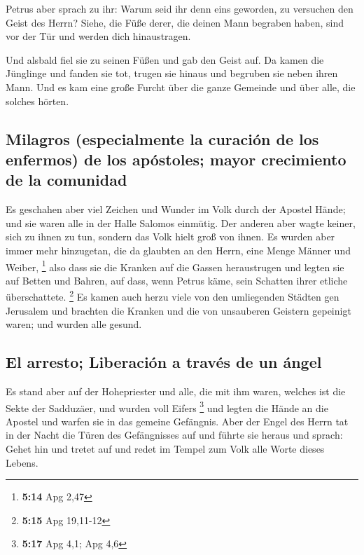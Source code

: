  Petrus aber sprach zu ihr: Warum seid ihr denn eins
geworden, zu versuchen den Geist des Herrn? Siehe, die Füße derer, die
deinen Mann begraben haben, sind vor der Tür und werden dich
hinaustragen.

 Und alsbald fiel sie zu seinen Füßen und gab den Geist
auf. Da kamen die Jünglinge und fanden sie tot, trugen sie hinaus und
begruben sie neben ihren Mann.  Und es kam eine große
Furcht über die ganze Gemeinde und über alle, die solches hörten.

\hypertarget{milagros-especialmente-la-curaciuxf3n-de-los-enfermos-de-los-apuxf3stoles-mayor-crecimiento-de-la-comunidad}{%
\subsection{Milagros (especialmente la curación de los enfermos) de los
apóstoles; mayor crecimiento de la
comunidad}\label{milagros-especialmente-la-curaciuxf3n-de-los-enfermos-de-los-apuxf3stoles-mayor-crecimiento-de-la-comunidad}}

 Es geschahen aber viel Zeichen und Wunder im Volk durch
der Apostel Hände; und sie waren alle in der Halle Salomos einmütig.
 Der anderen aber wagte keiner, sich zu ihnen zu tun,
sondern das Volk hielt groß von ihnen.  Es wurden aber
immer mehr hinzugetan, die da glaubten an den Herrn, eine Menge Männer
und Weiber, \footnote{\textbf{5:14} Apg 2,47}  also dass
sie die Kranken auf die Gassen heraustrugen und legten sie auf Betten
und Bahren, auf dass, wenn Petrus käme, sein Schatten ihrer etliche
überschattete. \footnote{\textbf{5:15} Apg 19,11-12}  Es
kamen auch herzu viele von den umliegenden Städten gen Jerusalem und
brachten die Kranken und die von unsauberen Geistern gepeinigt waren;
und wurden alle gesund.

\hypertarget{el-arresto-liberaciuxf3n-a-travuxe9s-de-un-uxe1ngel}{%
\subsection{El arresto; Liberación a través de un
ángel}\label{el-arresto-liberaciuxf3n-a-travuxe9s-de-un-uxe1ngel}}

 Es stand aber auf der Hohepriester und alle, die mit ihm
waren, welches ist die Sekte der Sadduzäer, und wurden voll Eifers
\footnote{\textbf{5:17} Apg 4,1; Apg 4,6}  und legten die
Hände an die Apostel und warfen sie in das gemeine Gefängnis.
 Aber der Engel des Herrn tat in der Nacht die Türen des
Gefängnisses auf und führte sie heraus und sprach:  Gehet
hin und tretet auf und redet im Tempel zum Volk alle Worte dieses
Lebens.

